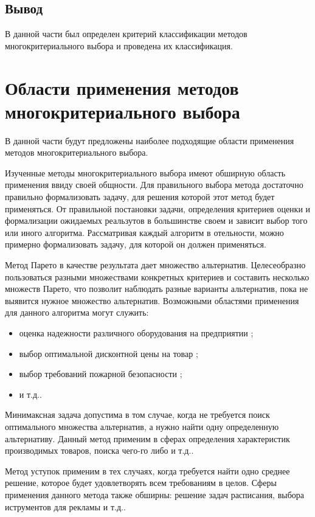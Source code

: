 \section{Вывод}

В данной части был определен критерий классификации методов многокритериального выбора и проведена их классификация.

\chapter{Области применения методов многокритериального выбора}
В данной части будут предложены наиболее подходящие области применения методов многокритериального выбора.

Изученные методы многокритериального выбора имеют обширную область применения ввиду своей общности. Для правильного выбора метода достаточно правильно формализовать задачу, для решения которой этот метод будет применяться. От правильной постановки задачи, определения критериев оценки и формализации ожидаемых реальзутов в большинстве своем и зависит выбор того или иного алгоритма.
Рассматривая каждый алгоритм в отельности, можно примерно формализовать задачу, для которой он должен применяться. 

Метод Парето в качестве результата дает множество альтернатив. Целесеобразно пользоваться разными множествами конкретных критериев и составить несколько множеств Парето, что позволит наблюдать разные варианты альтернатив, пока не выявится нужное множество альтернатив. Возможными областями применения для данного алгоритма могут служить:
\begin{itemize}[label=--]
    \item оценка надежности различного оборудования на предприятии \cite{bib9};
    \item выбор оптимальной дисконтной цены на товар \cite{bib12};
    \item выбор требований пожарной безопасности \cite{bib11};
    \item и т.д..
\end{itemize}

Минимаксная задача допустима в том случае, когда не требуется поиск оптимального множества альтернатив, а нужно найти одну определенную альтернативу. Данный метод применим в сферах определения характеристик производимых товаров, поиска чего-го либо и т.д.. \cite{bib13} \cite{bib14}

Метод уступок применим в тех случаях, когда требуется найти одно среднее решение, которое будет удовлетворять всем требованиям в целов. Сферы применения данного метода также обширны: решение задач расписания, выбора иструментов для рекламы и т.д..\cite{bib13} \cite{bib16}

